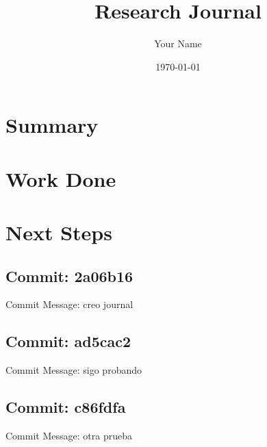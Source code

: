 \documentclass{article}
\begin{document}
\title{Research Journal}
\author{Your Name}
\date{\today}

\maketitle

\section{Summary}

\section{Work Done}

\section{Next Steps}


\subsection{Commit: 2a06b16}

Commit Message: creo journal


\subsection{Commit: ad5cac2}

Commit Message: sigo probando


\subsection{Commit: c86fdfa}

Commit Message: otra prueba
\end{document}
